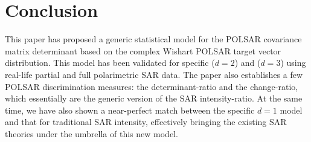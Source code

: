 \documentclass[journal]{IEEEtran}
\begin{document}
%
%  

\section{Conclusion}
\label{sec:conclusion}

This paper has proposed a generic statistical model  for the POLSAR covariance matrix determinant based on the complex Wishart POLSAR target vector distribution.%
This model has been validated for specific ($d=2$) and ($d=3$) using real-life partial and full polarimetric SAR data.
The paper also establishes a few POLSAR discrimination measures: the determinant-ratio and the change-ratio,  which essentially are the generic version of the SAR intensity-ratio.
At the same time, we have also shown a near-perfect match between the specific $d=1$ model and that for traditional SAR intensity,
  effectively bringing the existing SAR theories under the umbrella of this new model.
\end{document}

